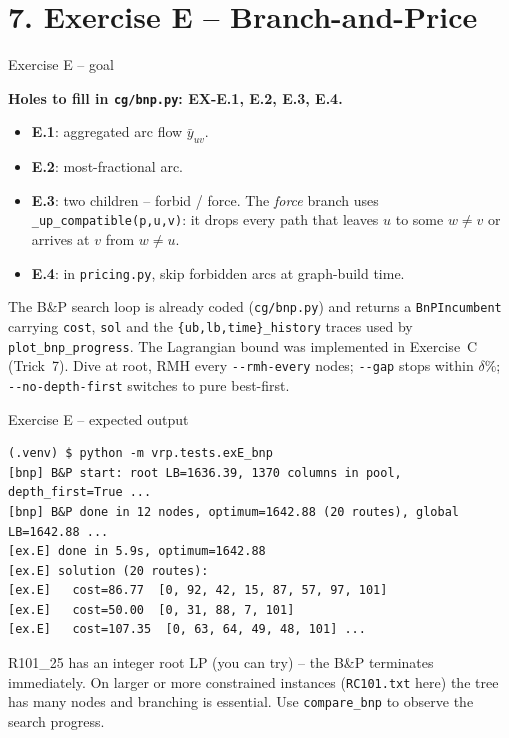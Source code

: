 \documentclass[10pt,aspectratio=169]{beamer}
\begin{document}
\section{7. Exercise E -- Branch-and-Price}

\begin{frame}{Exercise E -- goal}
  \begin{exbox}
    \textbf{Holes to fill in \texttt{cg/bnp.py}: EX-E.1, E.2, E.3, E.4.}
    \begin{itemize}\small
      \item \textbf{E.1}: aggregated arc flow $\bar y_{uv}$.
      \item \textbf{E.2}: most-fractional arc.
      \item \textbf{E.3}: two children -- forbid / force. The
            \emph{force} branch uses \texttt{\_up\_compatible(p,u,v)}: it
            drops every path that leaves $u$ to some $w\!\ne\!v$ or
            arrives at $v$ from $w\!\ne\!u$.
      \item \textbf{E.4}: in \texttt{pricing.py}, skip forbidden arcs at
            graph-build time.
    \end{itemize}
    The B\&P search loop is \alert{already coded} (\texttt{cg/bnp.py})
    and returns a \texttt{BnPIncumbent} carrying \texttt{cost},
    \texttt{sol} and the \texttt{\{ub,lb,time\}\_history} traces used by
    \texttt{plot\_bnp\_progress}. The Lagrangian bound was implemented in
    Exercise~C (Trick~7). Dive at root, RMH every \texttt{{-}{-}rmh-every}
    nodes; \texttt{{-}{-}gap} stops within $\delta\%$;
    \texttt{{-}{-}no-depth-first} switches to pure best-first.
  \end{exbox}
\end{frame}

\begin{frame}[fragile]{Exercise E -- expected output}
\begin{lstlisting}[style=sh,basicstyle=\ttfamily\scriptsize]
(.venv) $ python -m vrp.tests.exE_bnp
[bnp] B&P start: root LB=1636.39, 1370 columns in pool, depth_first=True ...
[bnp] B&P done in 12 nodes, optimum=1642.88 (20 routes), global LB=1642.88 ...
[ex.E] done in 5.9s, optimum=1642.88
[ex.E] solution (20 routes):
[ex.E]   cost=86.77  [0, 92, 42, 15, 87, 57, 97, 101]
[ex.E]   cost=50.00  [0, 31, 88, 7, 101]
[ex.E]   cost=107.35  [0, 63, 64, 49, 48, 101] ...
\end{lstlisting}
  \begin{tipbox}[1 node = proven optimal without branching]
    R101\_25 has an integer root LP (you can try) -- the B\&P terminates immediately.
    On larger or more constrained instances (\texttt{RC101.txt} here) the tree has many nodes and branching is essential. Use \texttt{compare\_bnp} to observe the search progress.
  \end{tipbox}
\end{frame}
\end{document}
